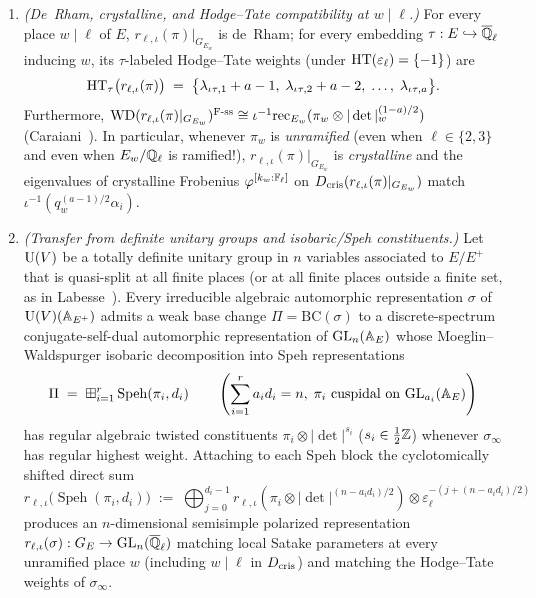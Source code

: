 \begin{theorem}
\begin{enumerate}[label=\textup{(\Alph*)}]
\begin{enumerate}[label=\textup{(A\arabic*)}]
\item \emph{(De~Rham, crystalline, and Hodge--Tate compatibility at $w \mid \ell$.)} For every place $w \mid \ell$ of $E$, $r_{\ell,\iota}(\pi)|_{G_{E_w}}$ is de~Rham; for every embedding $\tau : E \hookrightarrow \overline{\mathbb{Q}}_\ell$ inducing $w$, its $\tau$-labeled Hodge--Tate weights (under $\mathrm{HT}(\varepsilon_\ell) = \{-1\}$) are
  \[
    \mathrm{HT}_\tau\bigl(r_{\ell,\iota}(\pi)\bigr) \;=\; \bigl\{\lambda_{\iota\tau, 1} + a - 1,\; \lambda_{\iota\tau, 2} + a - 2,\; \dots,\; \lambda_{\iota\tau, a}\bigr\}.
  \]
  Furthermore, $\mathrm{WD}(r_{\ell,\iota}(\pi)|_{G_{E_w}})^{\mathrm{F}\text{-}\mathrm{ss}} \cong \iota^{-1}\mathrm{rec}_{E_w}(\pi_w \otimes |\det|_w^{(1-a)/2})$ (Caraiani~\cite{Caraiani2014}). In particular, whenever $\pi_w$ is \emph{unramified} (even when $\ell \in \{2, 3\}$ and even when $E_w/\mathbb{Q}_\ell$ is ramified!), $r_{\ell,\iota}(\pi)|_{G_{E_w}}$ is \emph{crystalline} and the eigenvalues of crystalline Frobenius $\varphi^{[k_w:\mathbb{F}_\ell]}$ on $D_{\mathrm{cris}}(r_{\ell,\iota}(\pi)|_{G_{E_w}})$ match $\iota^{-1}(q_w^{(a-1)/2}\alpha_i)$.
\item \emph{(Transfer from definite unitary groups and isobaric/Speh constituents.)} Let $\mathrm{U}(V)$ be a totally definite unitary group in $n$ variables associated to $E/E^+$ that is quasi-split at all finite places (or at all finite places outside a finite set, as in Labesse~\cite[Corollaire~5.3]{Labesse2011}). Every irreducible algebraic automorphic representation $\sigma$ of $\mathrm{U}(V)(\mathbb{A}_{E^+})$ admits a weak base change $\Pi = \mathrm{BC}(\sigma)$ to a discrete-spectrum conjugate-self-dual automorphic representation of $\mathrm{GL}_n(\mathbb{A}_E)$ whose Moeglin--Waldspurger isobaric decomposition into Speh representations
  \[
    \Pi \;=\; \boxplus_{i=1}^r \operatorname{Speh}(\pi_i, d_i) \qquad \left(\sum_{i=1}^r a_i d_i = n,\; \pi_i \text{ cuspidal on } \mathrm{GL}_{a_i}(\mathbb{A}_E)\right)
  \]
  has regular algebraic twisted constituents $\pi_i \otimes |\det|^{s_i}$ ($s_i \in \frac{1}{2}\mathbb{Z}$) whenever $\sigma_\infty$ has regular highest weight. Attaching to each Speh block the cyclotomically shifted direct sum
  \begin{equation}
  \label{eq:01:speh-galois}
    r_{\ell,\iota}\bigl(\operatorname{Speh}(\pi_i, d_i)\bigr) \;:=\; \bigoplus_{j = 0}^{d_i - 1} r_{\ell,\iota}\!\left(\pi_i \otimes |\det|^{(n - a_i d_i)/2}\right) \otimes \varepsilon_\ell^{-(j + (n - a_i d_i)/2)}
  \end{equation}
  produces an $n$-dimensional semisimple polarized representation $r_{\ell,\iota}(\sigma) : G_E \to \mathrm{GL}_n(\overline{\mathbb{Q}}_\ell)$ matching local Satake parameters at every unramified place $w$ (including $w \mid \ell$ in $D_{\mathrm{cris}}$) and matching the Hodge--Tate weights of $\sigma_\infty$.
\end{enumerate}


\end{enumerate}
\end{theorem}
